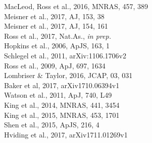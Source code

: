 \begin{multicols}{2}[]
\rbrack MacLeod, Ross et al., 2016, MNRAS, 457, 389\\
\rbrack Meisner et al., 2017, AJ, 153, 38 \\
\rbrack Meisner et al., 2017, AJ, 154, 161 \\
\rbrack Ross et al., 2017, Nat.As., {\it in prep.} \\
\rbrack Hopkins et al., 2006, ApJS, 163, 1\\
\rbrack Schlegel et al., 2011,  arXiv:1106.1706v2 \\
%
\rbrack Ross et al., 2009, ApJ, 697, 1634 \\
\rbrack Lombriser \& Taylor, 2016, JCAP, 03, 031 \\
\rbrack Baker et al, 2017,  arXiv1710.06394v1 \\
\rbrack Watson et al.,  2011, ApJ, 740, L49\\
\rbrack King et al., 2014, MNRAS, 441, 3454\\
\rbrack King et al., 2015, MNRAS, 453, 1701\\
\rbrack Shen et al., 2015, ApJS, 216, 4\\
\rbrack Hviding et al.,  2017, arXiv1711.01269v1 



\end{multicols}
